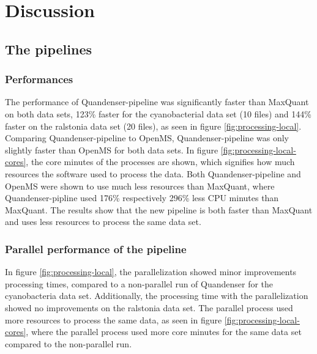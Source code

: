 \section{Discussion}

\subsection{The pipelines}

\subsubsection{Performances}
The performance of Quandenser-pipeline was significantly faster than MaxQuant on both data sets, 123\% faster for the cyanobacterial data set (10 files) and 144\% faster on the ralstonia data set (20 files), as seen in figure \ref{fig:processing-local}. Comparing Quandenser-pipeline to OpenMS, Quandenser-pipeline was only slightly faster than OpenMS for both data sets. In figure \ref{fig:processing-local-cores}, the core minutes of the processes are shown, which signifies how much resources the software used to process the data. Both Quandenser-pipeline and OpenMS were shown to use much less resources than MaxQuant, where Quandenser-pipline used 176\% respectively 296\% less CPU minutes than MaxQuant. The results show that the new pipeline is both faster than MaxQuant and uses less resources to process the same data set.

\subsubsection{Parallel performance of the pipeline}
In figure \ref{fig:processing-local}, the parallelization showed minor improvements processing times, compared to a non-parallel run of Quandenser for the cyanobacteria data set. Additionally, the processing time with the parallelization showed no improvements on the ralstonia data set. The parallel process used more resources to process the same data, as seen in figure \ref{fig:processing-local-cores}, where the parallel process used more core minutes for the same data set compared to the non-parallel run.


